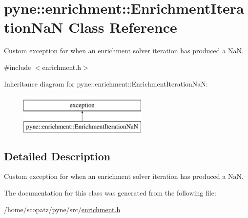 \hypertarget{classpyne_1_1enrichment_1_1_enrichment_iteration_na_n}{\section{pyne\-:\-:enrichment\-:\-:Enrichment\-Iteration\-Na\-N Class Reference}
\label{classpyne_1_1enrichment_1_1_enrichment_iteration_na_n}
}


Custom exception for when an enrichment solver iteration has produced a Na\-N.  




{\ttfamily \#include $<$enrichment.\-h$>$}

Inheritance diagram for pyne\-:\-:enrichment\-:\-:Enrichment\-Iteration\-Na\-N\-:\begin{figure}[H]
\begin{center}
\leavevmode
\includegraphics[height=2.000000cm]{classpyne_1_1enrichment_1_1_enrichment_iteration_na_n}
\end{center}
\end{figure}


\subsection{Detailed Description}
Custom exception for when an enrichment solver iteration has produced a Na\-N. 

The documentation for this class was generated from the following file\-:\begin{DoxyCompactItemize}
\item 
/home/scopatz/pyne/src/\hyperlink{enrichment_8h}{enrichment.\-h}\end{DoxyCompactItemize}
